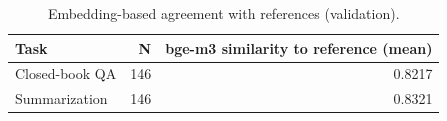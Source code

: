 \begin{table}[t]
\centering
\caption{Embedding-based agreement with references (validation).}
\label{tab:t8_semantic_agreement}
\begin{tabular}{lrr}
\toprule
Task & N & bge-m3 similarity to reference (mean) \\
\midrule
Closed-book QA & 146 & 0.8217 \\
Summarization & 146 & 0.8321 \\
\bottomrule
\end{tabular}
\end{table}
